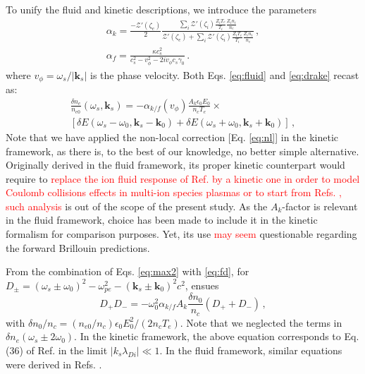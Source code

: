 \documentclass[
 reprint,
 superscriptaddress,
 amsmath,amssymb,
 aps,
]{revtex4-1}
\def\tc{\textcolor{red}}
\begin{document}
To unify the fluid and kinetic descriptions, we introduce the parameters
\begin{align}
   \alpha_k  = \frac{-\mathcal{Z}'( \zeta_e) }{2}
 \frac{\sum_i\mathcal{Z}'( \zeta_i)\frac{  Z_iT_e}{ T_i }\frac{  Z_in_i}{ n_e }   }{  \mathcal{Z}'( \zeta_e)+ \sum_i\mathcal{Z}'( \zeta_i)\frac{  Z_iT_e}{ T_i }\frac{ Z_i n_i}{ n_e }  }\, ,\label{eq:alphak} \\
   \alpha_f = \frac{\kappa c_s^2}{ c_s^2-v_\phi^2 -2iv_\phi c_s \gamma_0}\, .\label{eq:alphaf}
\end{align}
where $v_\phi = \omega_s/\vert \mathbf{k}_s\vert $ is the phase velocity.
Both Eqs. \eqref{eq:fluid} and  \eqref{eq:drake} recast as:
\begin{align}
   \frac{\delta n_e }{n_{e0}}(\omega_s,\mathbf{k}_s) = -\alpha_{k/f}(v_\phi) \frac{A_k\epsilon_0 E_0}{n_c T_e}\times \nonumber\\ \left[\delta E(\omega_s-\omega_0, \mathbf{k}_s-\mathbf{k}_0) +\delta E(\omega_s+\omega_0, \mathbf{k}_s+\mathbf{k}_0) \right] \, ,\label{eq:fd}
\end{align}
Note that we have  applied the non-local correction [Eq. \eqref{eq:nl}] in the kinetic framework, as there is, to the best of our knowledge,  no better simple alternative. Originally derived in the fluid framework, its proper kinetic counterpart would require to \tc{replace the ion fluid response of Ref. \cite[]{POP_Berger_2005} by a kinetic one in order to model Coulomb collisions effects in multi-ion species plasmas \cite[]{POP_Berger_2005b} or to start from Refs. \cite[]{POP_Epperlein_94,POP_Bychenkov_1998}, such analysis } is out of the scope of the present study. As the $A_k$-factor is relevant in the fluid framework, choice has been made to include it in the kinetic formalism for comparison purposes. Yet, its use \tc{may seem} questionable regarding the forward Brillouin predictions.

From the combination of  Eqs. \eqref{eq:max2} with \eqref{eq:fd}, 
for $D_\pm= (\omega_s\pm \omega_0)^2 - \omega_{pe}^2 -( \mathbf{k}_s\pm \mathbf{k}_0) ^2c^2 $, ensues
\begin{equation}\label{eq:dispe}
    D_+D_- = -\omega_{0}^2\alpha_{k/f}A_k\frac{\delta n_0}{n_c} (D_++D_-) \, ,
\end{equation}
with $\delta n_0/n_c = (n_{e0}/n_c) \epsilon_0E_0^2/(2n_c T_e)$.
Note that we neglected the terms in $\delta n_e(\omega_s \pm 2\omega_0)$.
In the kinetic framework, the above equation corresponds to Eq. (36) of Ref. \cite[]{POF_Cohen_79} in the limit $\vert k_s \lambda_{Di} \vert \ll 1$. In the fluid framework, similar equations were derived in Refs. \cite[]{Kruer,phd_Michel,phd-Grech}.
\end{document}
